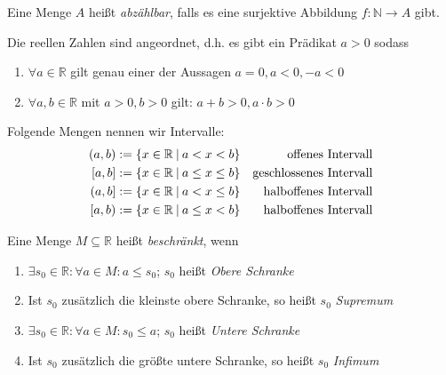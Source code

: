 \documentclass[]{article}
\begin{document}
\begin{definition}
	Eine Menge $A$ heißt \emph{abzählbar}, falls es eine surjektive Abbildung $f : \mathbb{N} \rightarrow A $ gibt.
\end{definition}

\begin{definition}
	Die reellen Zahlen sind angeordnet, d.h. es gibt ein Prädikat $a > 0$ sodass
	\begin{enumerate}[noitemsep]
		\item $\forall a \in \mathbb{R}$ gilt genau einer der Aussagen $a = 0, a < 0, -a < 0$
		\item $\forall a,b \in \mathbb{R}$ mit $a > 0, b > 0$ gilt: $a + b > 0, a \cdot b > 0$
	\end{enumerate}
\end{definition}

\begin{definition}
	Folgende Mengen nennen wir Intervalle:
	\begin{align}
		(a,b) &:= \{ x \in \mathbb{R} \medspace | \medspace  a    < x    < b \} & \textnormal{offenes Intervall}       \\
		[a,b] &:= \{ x \in \mathbb{R} \medspace | \medspace  a \leq x \leq b \} & \textnormal{geschlossenes Intervall} \\
		(a,b] &:= \{ x \in \mathbb{R} \medspace | \medspace  a    < x \leq b \} & \textnormal{halboffenes Intervall}   \\
		[a,b) &:= \{ x \in \mathbb{R} \medspace | \medspace  a \leq x    < b \} & \textnormal{halboffenes Intervall}	
	\end{align}
\end{definition}

\begin{definition}
	Eine Menge $M \subseteq \mathbb{R}$ heißt \emph{beschränkt}, wenn
	\begin{enumerate}[noitemsep]
		\item $\exists s_0 \in \mathbb{R} : \forall a \in M : a \leq s_0$; $s_0$ heißt \emph{Obere Schranke}
		\item Ist $s_0$ zusätzlich die kleinste obere Schranke, so heißt $s_0$ \emph{Supremum}
		\item $\exists s_0 \in \mathbb{R} : \forall a \in M : s_0 \leq a$; $s_0$ heißt \emph{Untere Schranke}
		\item Ist $s_0$ zusätzlich die größte untere Schranke, so heißt $s_0$ \emph{Infimum}
	\end{enumerate}
\end{definition}
\end{document}
